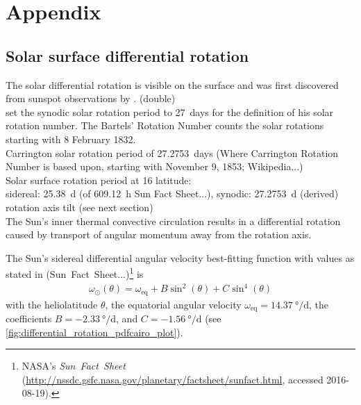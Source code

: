 
\chapter{Appendix}
\label{chap:appendix}

\section{Solar surface differential rotation}
\label{sec:solar_surface_differential_rotation}

The solar differential rotation is visible on the surface and was first discovered from sunspot observations by \citet{Scheiner1630}. (double)\\

\citet{Bartels1934} set the synodic solar rotation period to 27~days for the definition of his solar rotation number. The Bartels' Rotation Number counts the solar rotations starting with 8 February 1832.\\
Carrington solar rotation period of 27.2753~days (Where Carrington Rotation Number is based upon, starting with November 9, 1853; Wikipedia...)\\

Solar surface rotation period at 16\degree{} latitude:\\
sidereal: 25.38~d (of 609.12~h Sun Fact Sheet...), synodic: 27.2753~d (derived)\\

rotation axis tilt (see next section)\\

The Sun's inner thermal convective circulation results in a differential rotation caused by transport of angular momentum away from the rotation axis.

The Sun's sidereal differential angular velocity best-fitting function with values as stated in (Sun~Fact~Sheet...)\footnote{NASA's \textit{Sun~Fact~Sheet} (\url{http://nssdc.gsfc.nasa.gov/planetary/factsheet/sunfact.html}, accessed 2016-08-19).} is
\begin{align}
	\omega_\odot(\theta) = \omega_\text{eq} + B \sin^2(\theta) + C \sin^4(\theta)	\label{eq:omega_differential}
\end{align}
with the heliolatitude $\theta$, the equatorial angular velocity $\omega_\text{eq} = \SI{14.37}{\degree\per\day}$, the coefficients $B = \SI{-2.33}{\degree\per\day}$, and $C = \SI{-1.56}{\degree\per\day}$ (see \autoref{fig:differential_rotation_pdfcairo_plot}).

